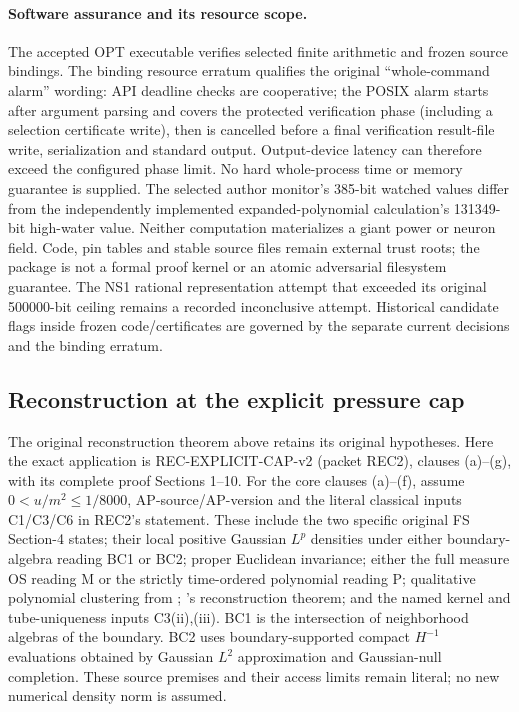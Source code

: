 \documentclass[11pt]{article}
\theoremstyle{plain}
\theoremstyle{definition}
\theoremstyle{remark}
\begin{document}
\paragraph{Software assurance and its resource scope.}
The accepted OPT executable verifies selected finite arithmetic and frozen
source bindings. The binding resource erratum qualifies the original
``whole-command alarm'' wording: API deadline checks are cooperative;
the POSIX alarm starts after argument parsing and covers the protected
verification phase (including a selection certificate write), then is
cancelled before a final verification result-file write, serialization and
standard output. Output-device latency can therefore exceed the configured
phase limit. No hard whole-process time or memory guarantee is supplied.
The selected author monitor's 385-bit watched values differ from the
independently implemented expanded-polynomial calculation's 131349-bit
high-water value. Neither computation materializes a giant power or neuron
field. Code, pin tables and stable source files remain external trust
roots; the package is not a formal proof kernel or an atomic adversarial
filesystem guarantee. The NS1 rational representation attempt that exceeded
its original 500000-bit ceiling remains a recorded inconclusive attempt.
Historical candidate flags inside frozen code/certificates are governed by
the separate current decisions and the binding erratum.

\subsection{Reconstruction at the explicit pressure cap}
\label{qrs:reconstruction}

The original reconstruction theorem above retains its original hypotheses.
Here the exact application is REC-EXPLICIT-CAP-v2 (packet REC2), clauses
(a)--(g), with its complete proof Sections 1--10. For the core clauses
(a)--(f), assume $0<u/m^2\le1/8000$, AP-source/AP-version and the literal
classical inputs C1/C3/C6 in REC2's statement. These include the two
specific original FS Section-4 states; their local positive Gaussian
$L^p$ densities under either boundary-algebra reading BC1 or BC2; proper
Euclidean invariance; either the full measure OS reading M or the
strictly time-ordered polynomial reading P; qualitative polynomial
clustering from \cite[Thm.~4.4, p.~511]{FS1977};
\cite[Thm.~1.0, p.~495]{FS1977}'s reconstruction theorem; and the named
kernel and tube-uniqueness inputs C3(ii),(iii). BC1 is the intersection
of neighborhood algebras of the boundary. BC2 uses boundary-supported
compact $H^{-1}$ evaluations obtained by Gaussian $L^2$ approximation and
Gaussian-null completion. These source premises and their access limits
remain literal; no new numerical density norm is assumed.
\end{document}
